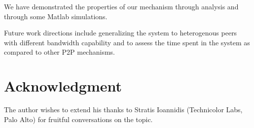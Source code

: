 \documentclass[11pt,conference]{IEEEtran}
\begin{document}
We have demonstrated the properties of our mechanism through analysis and through some Matlab simulations.

Future work directions include generalizing the system to heterogenous peers with different bandwidth capability and to assess the time spent in the system as compared to other P2P mechanisms.







\section*{Acknowledgment}

The author wishes to extend his thanks to Stratis Ioannidis (Technicolor Labs, Palo Alto) for fruitful conversations on the topic.









\end{document}
